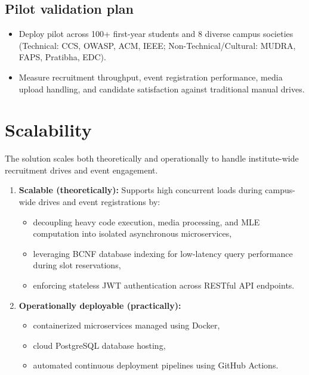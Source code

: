 \documentclass[11pt,a4paper]{article}
\begin{document}
\subsection{Pilot validation plan}
\begin{itemize}[leftmargin=0.7cm]
    \item Deploy pilot across 100+ first-year students and 8 diverse campus societies (Technical: CCS, OWASP, ACM, IEEE; Non-Technical/Cultural: MUDRA, FAPS, Pratibha, EDC).
    \item Measure recruitment throughput, event registration performance, media upload handling, and candidate satisfaction against traditional manual drives.
\end{itemize}

\section{Scalability}
The solution scales both theoretically and operationally to handle institute-wide recruitment drives and event engagement.

\begin{enumerate}[leftmargin=0.7cm]
    \item \textbf{Scalable (theoretically):} Supports high concurrent loads during campus-wide drives and event registrations by:
    \begin{itemize}[leftmargin=0.7cm]
        \item decoupling heavy code execution, media processing, and MLE computation into isolated asynchronous microservices,
        \item leveraging BCNF database indexing for low-latency query performance during slot reservations,
        \item enforcing stateless JWT authentication across RESTful API endpoints.
    \end{itemize}
    
    \item \textbf{Operationally deployable (practically):}
    \begin{itemize}[leftmargin=0.7cm]
        \item containerized microservices managed using Docker,
        \item cloud PostgreSQL database hosting,
        \item automated continuous deployment pipelines using GitHub Actions.
    \end{itemize}
\end{enumerate}
\end{document}
